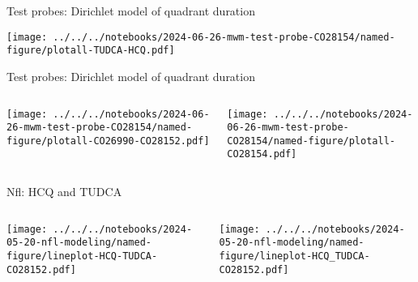 \documentclass[aspectratio=169]{beamer}
\begin{document}
\begin{frame}{Test probes: Dirichlet model of quadrant duration}
\begin{center}
  \texttt{[image: ../../../notebooks/2024-06-26-mwm-test-probe-CO28154/named-figure/plotall-TUDCA-HCQ.pdf]}
\end{center}
\end{frame}

\begin{frame}{Test probes: Dirichlet model of quadrant duration}
\begin{columns}[t]
\begin{column}{0.5\textwidth}

  \texttt{[image: ../../../notebooks/2024-06-26-mwm-test-probe-CO28154/named-figure/plotall-CO26990-CO28152.pdf]}
\end{column}

\begin{column}{0.5\textwidth}

  \texttt{[image: ../../../notebooks/2024-06-26-mwm-test-probe-CO28154/named-figure/plotall-CO28154.pdf]}
\end{column}
\end{columns}
\begin{center}
\end{center}
\end{frame}



%


\begin{frame}{Nfl: HCQ and TUDCA}
\begin{columns}[t]
\begin{column}{0.6\textwidth}

  \texttt{[image: ../../../notebooks/2024-05-20-nfl-modeling/named-figure/lineplot-HCQ-TUDCA-CO28152.pdf]}
\end{column}

\begin{column}{0.4\textwidth}

  \texttt{[image: ../../../notebooks/2024-05-20-nfl-modeling/named-figure/lineplot-HCQ\_TUDCA-CO28152.pdf]}
\end{column}
\end{columns}
\end{frame}
\end{document}
